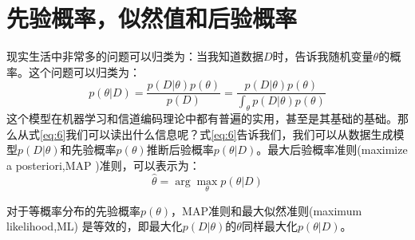 \documentclass[10pt,a4paper,UTF8]{article}
\begin{document}
\section{先验概率，似然值和后验概率}
\label{sec:org37a9fb1}


现实生活中非常多的问题可以归类为：当我知道数据\(D\)时，告诉我随机变量\(\theta\)的概率。这个问题可以归类为：
\begin{equation}
\label{eq:6}
p(\theta |D) = \frac{p(D|\theta)p(\theta)}{p(D)} = \frac{p(D|\theta)p(\theta)}{\int_{\theta}p(D|\theta)p(\theta)} 
\end{equation}
这个模型在机器学习和信道编码理论中都有普遍的实用，甚至是其基础的基础。那么从式\ref{eq:6}我们可以读出什么信息呢？式\ref{eq:6}告诉我们，我们可以从数据生成模型\(p(D|\theta)\)和先验概率\(p(\theta)\)推断后验概率\(p(\theta |D)\)。最大后验概率准则(maximize a posteriori,MAP )准则，可以表示为：
\begin{equation}
\label{eq:7}
\hat{\theta} = \arg \max_{\theta} p(\theta | D)
\end{equation}

对于等概率分布的先验概率\(p(\theta)\)，MAP准则和最大似然准则(maximum likelihood,ML) 是等效的，即最大化\(p(D|\theta)\)的\(\theta\)同样最大化\(p(\theta|D)\)。
\end{document}
